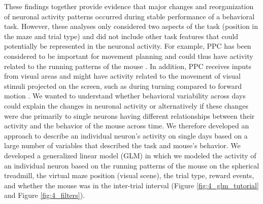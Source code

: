 These findings together provide evidence that major changes and reorganization of neuronal activity patterns occurred during stable performance of a behavioral task. However, these analyses only considered two aspects of the task (position in the maze and trial type) and did not include other task features that could potentially be represented in the neuronal activity. For example, PPC has been considered to be important for movement planning and could thus have activity related to the running patterns of the mouse \citep{Andersen2009, Nitz2006, Whitlock2012}. In addition, PPC receives inputs from visual areas and might have activity related to the movement of visual stimuli projected on the screen, such as during turning compared to forward motion \citep{Harvey:2012du, Oh2014}. We wanted to understand whether behavioral variability across days could explain the changes in neuronal activity or alternatively if these changes were due primarily to single neurons having different relationships between their activity and the behavior of the mouse across time. We therefore developed an approach to describe an individual neuron's activity on single days based on a large number of variables that described the task and mouse's behavior. We developed a generalized linear model (GLM) in which we modeled the activity of an individual neuron based on the running patterns of the mouse on the spherical treadmill, the virtual maze position (visual scene), the trial type, reward events, and whether the mouse was in the inter-trial interval \citep{Friedman2010, Park2014} (Figure \ref{fig:4_glm_tutorial} and Figure \ref{fig:4_filters}). 

